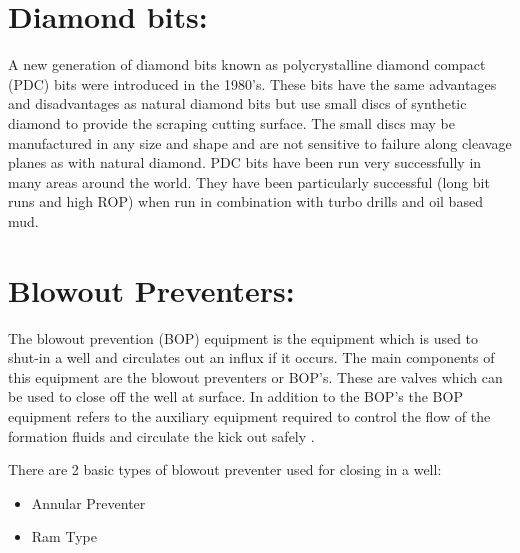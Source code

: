 \vspace{1em}

\section*{\textbf{Diamond bits:}} 

 A new generation of diamond bits
known as polycrystalline diamond compact (PDC)
bits were introduced in the 1980’s. These bits have
the same advantages and disadvantages as natural
diamond bits but use small discs of synthetic
diamond to provide the scraping cutting surface. The
small discs may be manufactured in any size and
shape and are not sensitive to failure along cleavage
planes as with natural diamond. PDC bits have been
run very successfully in many areas around the
world. They have been particularly successful (long
bit runs and high ROP) when run in combination with
turbo drills and oil based mud.

\vspace{1em}

\section*{Blowout Preventers:}

The blowout prevention (BOP)
equipment is the equipment which is used to shut-in a
well and circulates out an influx if it occurs. The
main components of this equipment are the blowout
preventers or BOP's. These are valves which can be
used to close off the well at surface. In addition to the
BOP's the BOP equipment refers to the auxiliary
equipment required to control the flow of the
formation fluids and circulate the kick out safely .

\vspace{1em}


\noindent There are 2 basic types of blowout preventer used for closing in a
well:
\begin{itemize}
\item Annular Preventer
\item Ram Type
\end{itemize}
 
